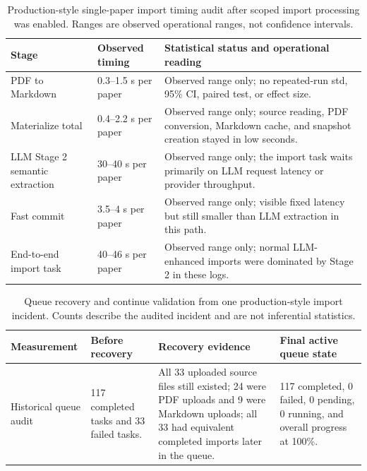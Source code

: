 \documentclass[11pt]{article}
\begin{document}
\begin{table}[t]
\centering
\caption{Production-style single-paper import timing audit after scoped import processing was enabled. Ranges are observed operational ranges, not confidence intervals.}
\label{tab:local-import-timing-shape}
\scriptsize
\begin{tabularx}{\linewidth}{@{}l l Y@{}}
\toprule
Stage & Observed timing & Statistical status and operational reading \\
\midrule
PDF to Markdown & 0.3--1.5 s per paper & Observed range only; no repeated-run std, 95\% CI, paired test, or effect size. \\
Materialize total & 0.4--2.2 s per paper & Observed range only; source reading, PDF conversion, Markdown cache, and snapshot creation stayed in low seconds. \\
LLM Stage 2 semantic extraction & 30--40 s per paper & Observed range only; the import task waits primarily on LLM request latency or provider throughput. \\
Fast commit & 3.5--4 s per paper & Observed range only; visible fixed latency but still smaller than LLM extraction in this path. \\
End-to-end import task & 40--46 s per paper & Observed range only; normal LLM-enhanced imports were dominated by Stage 2 in these logs. \\
\bottomrule
\end{tabularx}
\end{table}

\begin{table}[t]
\centering
\caption{Queue recovery and continue validation from one production-style import incident. Counts describe the audited incident and are not inferential statistics.}
\label{tab:local-queue-recovery}
\footnotesize
\begin{tabularx}{\linewidth}{@{}l Y Y Y@{}}
\toprule
Measurement & Before recovery & Recovery evidence & Final active queue state \\
\midrule
Historical queue audit & 117 completed tasks and 33 failed tasks. & All 33 uploaded source files still existed; 24 were PDF uploads and 9 were Markdown uploads; all 33 had equivalent completed imports later in the queue. & 117 completed, 0 failed, 0 pending, 0 running, and overall progress at 100\%. \\
\bottomrule
\end{tabularx}
\end{table}
\end{document}
